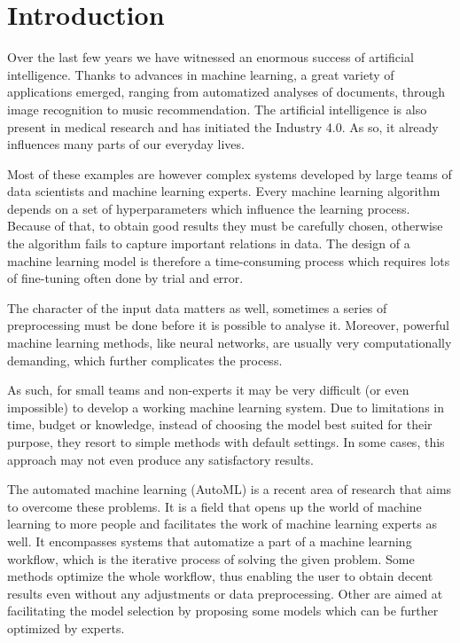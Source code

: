 \chapter*{Introduction}

Over the last few years we have witnessed an enormous success of artificial
intelligence. Thanks to advances in machine learning, a great variety of
applications emerged, ranging from automatized analyses of documents, through
image recognition to music recommendation. The artificial intelligence is also
present in medical research and has initiated the Industry 4.0. As so, it
already influences many parts of our everyday lives.

Most of these examples are however complex systems developed by large teams of
data scientists and machine learning experts. Every machine learning algorithm
depends on a set of hyperparameters which influence the learning process.
Because of that, to obtain good results they must be carefully chosen,
otherwise the algorithm fails to capture important relations in data. The
design of a machine learning model is therefore a time-consuming process
which requires lots of fine-tuning often done by trial and error. 

The character of the input data matters as well, sometimes
a series of preprocessing must be done before it is possible to analyse it.
Moreover, powerful machine learning methods, like neural networks, are usually
very computationally demanding, which further complicates the process.

As such, for small teams and non-experts it may be very difficult (or even
impossible) to develop a working machine learning system. Due to limitations
in time, budget or knowledge, instead of choosing the model best suited for
their purpose, they resort to simple methods with default settings. In some
cases, this approach may not even produce any satisfactory results.

The automated machine learning (AutoML) is a recent area of research that aims
to overcome these problems. It is a field that opens up the world of machine
learning to more people and facilitates the work of machine learning experts
as well. It encompasses systems that automatize a part of a machine learning
workflow, which is the iterative process of solving the given problem. Some
methods optimize the whole workflow, thus enabling the user to obtain decent
results even without any adjustments or data preprocessing. Other are aimed
at facilitating the model selection by proposing some models which can be
further optimized by experts.

